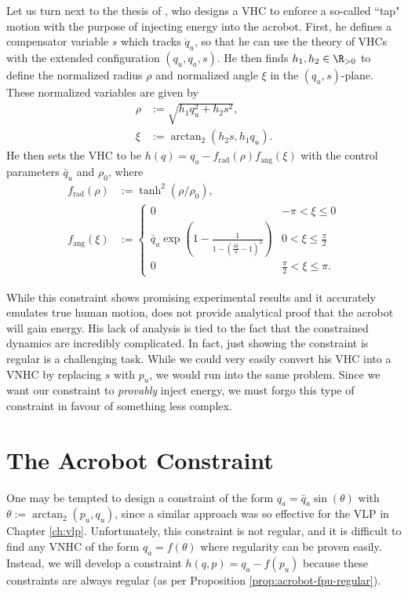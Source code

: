 Let us turn next to the thesis of \citet{xingbo_thesis}, who designs a VHC to enforce a
so-called ``tap" motion with the purpose of injecting energy into the acrobot. 
First, he defines a compensator variable \(s\) which tracks \(\dot{q}_u\), so
that he can use the theory of VHCs with the extended configuration 
\((q_u,q_a,s)\).
He then finds \(h_1, h_2 \in \R_{>0}\) to define the
normalized radius \(\rho\) and normalized angle \(\xi\) in the
\((q_u, s)\)-plane.
These normalized variables are given by
\begin{align*}
    \rho &:= \sqrt{h_1 q_u^2 + h_2 s^2}
    , \\
    \xi &:= \arctan_2(h_2 s, h_1 q_u)
    . 
\end{align*}
He then sets the VHC to be \(h(q) = q_a - f_\text{rad}(\rho)f_\text{ang}(\xi)\)
with the control parameters \(\bar{q}_u\) and \(\rho_0\), where
\begin{align}
    \label{eqn:xingbo-frad}
    f_\text{rad}(\rho) &:= \tanh^2(\rho/\rho_0)
    , \\
    \label{eqn:xingbo-fang}
    f_\text{ang}(\xi) &:= 
    \begin{cases}
        0 & -\pi < \xi \leq 0 \\
        \bar{q}_u \exp\left(1 - \frac{1}{1-(\frac{4\xi}{\pi} - 1)^2}\right) 
          & 0 < \xi \leq \frac{\pi}{2} \\
        0 & \frac{\pi}{2} < \xi \leq \pi
        .
    \end{cases}
\end{align}

While this constraint shows promising experimental results and it accurately
emulates true human motion, \citeauthor{xingbo_thesis}
does not provide analytical proof that the acrobot will gain energy.
His lack of analysis is tied to the fact that the constrained
dynamics are incredibly complicated.
In fact, just showing the constraint is regular is a challenging task.
While we could very easily convert his VHC into a VNHC by replacing \(s\) with
\(p_u\), we would run into the same problem. 
Since we want our constraint to \textit{provably} inject energy, we must forgo
this type of constraint in favour of something less complex.

\section{The Acrobot Constraint}
One may be tempted to design a constraint of the form \(q_a = \bar{q}_a\sin(\theta)\) 
with \(\theta := \arctan_2(p_u,q_u)\), since a similar approach 
was so effective for the VLP in Chapter \ref{ch:vlp}.
Unfortunately, this constraint is not regular, and it is difficult to find any
VNHC of the form \(q_a = f(\theta)\) where regularity can be proven easily.
Instead, we will develop a constraint \(h(q,p) = q_a - f(p_u)\) because these
constraints are always regular (as per Proposition \ref{prop:acrobot-fpu-regular}). 
 
